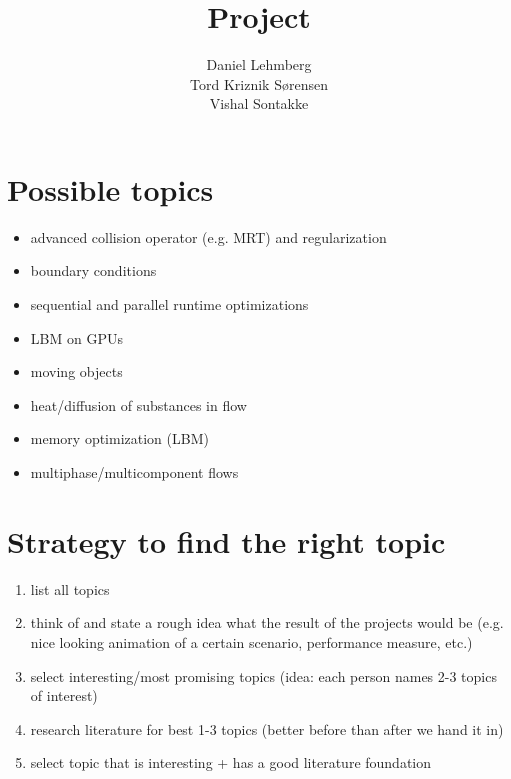 \documentclass[11pt]{article}
\title{\textbf{Project}}
\author{Daniel Lehmberg\\
		Tord Kriznik Sørensen\\
		Vishal Sontakke}
\date{}
\begin{document}
\maketitle

\section{Possible topics}
\begin{itemize}
\item advanced collision operator (e.g. MRT) and regularization
\item boundary conditions
\item sequential and parallel runtime optimizations
\item LBM on GPUs
\item moving objects
\item heat/diffusion of substances in flow
\item memory optimization (LBM)
\item multiphase/multicomponent flows
\end{itemize}

\section{Strategy to find the right topic}
\begin{enumerate}
\item list all topics
\item think of and state a rough idea what the result of the projects would be (e.g. nice looking animation of a certain scenario, performance measure, etc.)
\item select interesting/most promising topics (idea: each person names 2-3 topics of interest)
\item research literature for best 1-3 topics (better before than after we hand it in)
\item select topic that is interesting + has a good literature foundation
\end{enumerate}
\end{document}
